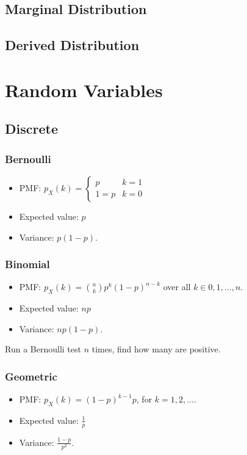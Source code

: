 \documentclass{article}
\begin{document}
\subsection{Marginal Distribution}
\subsection{Derived Distribution}

\newpage
\section{Random Variables}
\subsection{Discrete}
\subsubsection{Bernoulli}
\begin{itemize}
	\item PMF: $p_X(k) = \begin{cases}p & k = 1 \\ 1=p & k = 0\end{cases}$
	\item Expected value: $p$
	\item Variance: $p(1 - p)$.
\end{itemize}
\subsubsection{Binomial}
\begin{itemize}
	\item PMF: $p_X(k) = \binom{n}{k} p^k(1 - p)^{n - k}$ over all $k \in 0, 1, \ldots, n$.
	\item Expected value: $np$
	\item Variance: $np(1 - p)$.
\end{itemize}

Run a Bernoulli test $n$ times, find how many are positive.
\subsubsection{Geometric}
\begin{itemize}
	\item PMF: $p_X(k) = (1 - p)^{k - 1} p$, for $k = 1, 2, \ldots$.
	\item Expected value: $\frac{1}{p}$
	\item Variance: $\frac{1 - p}{p^2}$.
\end{itemize}
\end{document}
